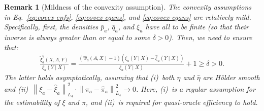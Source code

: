 \documentclass[dvipsnames]{article} %
\newcommand{\norm}[1]{\left\lVert#1\right\rVert}
\newtheorem{rem}{Remark}
\begin{document}
{\begin{rem}[Mildness of the convexity assumption] \label{rem:mildness}
    The convexity assumptions in Eq.~\eqref{eq:covex-cnfs}, \eqref{eq:covex-cgans}, and \eqref{eq:covex-cgans} are relatively mild. Specifically, first, the densities $\bar{p}_a$, $\bar{q}_a$, and $\xi_a$ have all to be finite (so that their inverse is always greater than or equal to some $\delta > 0$). Then, we need to ensure that:
    \begin{align}
        \frac{\tilde{\xi}^{\hat{\eta}}_a(X, A, Y)}{\xi_a(Y \mid X)} = \frac{(\hat{w}_a(A, X) - 1)(\xi_a(Y \mid X) - \hat{\xi}_a(Y \mid X))}{\xi_a(Y \mid X)} + 1 \ge \delta > 0.
    \end{align}
    The latter holds asymptotically, assuming that (i)~both $\eta$ and $\hat{\eta}$ are H\"older smooth and (ii)~$\norm{\xi_a - \hat{\xi}_a}_{L_4}^2 \cdot \norm{\pi_a - \hat{\pi}_a}_{L_4}^2 \to 0$. Here, (i)~is a regular assumption for the estimability of $\xi$ and $\pi$, and (ii)~is required for quasi-oracle efficiency to hold. 
\end{rem}}
\end{document}
